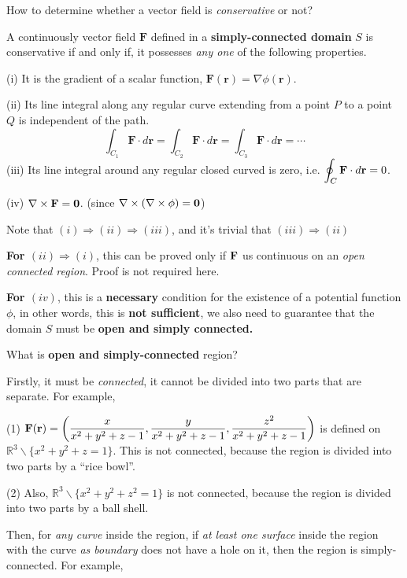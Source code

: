 \documentclass[11pt, a4paper]{MATH2023}
\newcommand{\rr}{{\bf r}}
\newcommand{\FF}{{\bf F}}
\begin{document}
\begin{spacing}{1.3}
    \newpage
    {\blue How to determine whether a vector field is {\it conservative} or not?}

    A continuously vector field $\mathbf{F}$ defined in a {\bf simply-connected domain} $S$ is conservative 
    if and only if, it possesses {\it any one} of the following properties.
    
    (i) It is the gradient of a scalar function, $\mathbf{F}(\mathbf{r})=\nabla \phi(\mathbf{r})$.
    
    (ii) Its line integral along any regular curve extending from a point $P$ to a point $Q$ is independent of the path.
    $$
    \int_{C_{1}} \mathbf{F} \cdot d \mathbf{r}=\int_{C_{2}} \mathbf{F} \cdot d \mathbf{r}=\int_{C_{3}} \mathbf{F} \cdot d \mathbf{r}=\cdots
    $$
    (iii) Its line integral around any regular closed curved is zero, i.e. $\displaystyle \oint_{C} \mathbf{F} \cdot d \mathbf{r}=0$.

    (iv) $\nabla \times \FF ={\bf 0}$. (since $\nabla \times (\nabla\times \phi)={\bf 0}$)

    {\blue Note that $(i)\Rightarrow (ii)\Rightarrow (iii)$, and it's trivial that $(iii)\Rightarrow (ii)$}

    \vspace{0.2in}
    {\bf For $(ii)\Rightarrow (i)$}, this can be proved only if $\FF$ us continuous on an {\it open connected region}.
    Proof is not required here.

    {\bf For $(iv)$}, this is a {\bf necessary} condition for the existence of a potential function $\phi$,
    in other words, this is {\bf not sufficient}, we also need to guarantee that the domain $S$ 
    must be {\bf open and simply connected.}

    \vspace{0.3in}
    What is {\bf open and simply-connected} region?

    Firstly, it must be {\it connected}, it cannot be divided into two parts that are separate. For example,

    (1) $\disp \FF(\rr)=\left(\frac{x}{x^2+y^2+z-1}, \frac{y}{x^2+y^2+z-1}, \frac{z^2}{x^2+y^2+z-1}\right)$
    is defined on $\mathbb{R}^3\backslash \{x^2+y^2+z=1\}$. This is not connected, because the region 
    is divided into two parts by a ``rice bowl''.

    (2) Also, $\mathbb{R}^3\backslash \{x^2+y^2+z^2=1\}$ is not connected, because the region 
    is divided into two parts by a ball shell.

    Then, for {\it any curve} inside the region, if {\it at least one surface} inside the region
    with the curve {\it as boundary}
    does not have a hole on it, then the region is simply-connected. For example,


\end{spacing}
\end{document}

